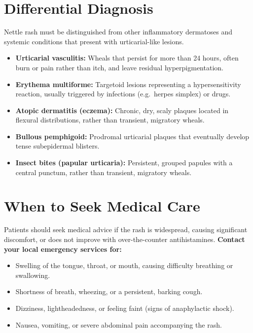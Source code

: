 \section*{Differential Diagnosis}
Nettle rash must be distinguished from other inflammatory dermatoses and systemic conditions that present with urticarial-like lesions.
\begin{itemize}
    \item \textbf{Urticarial vasculitis:} Wheals that persist for more than 24 hours, often burn or pain rather than itch, and leave residual hyperpigmentation.
    \item \textbf{Erythema multiforme:} Targetoid lesions representing a hypersensitivity reaction, usually triggered by infections (e.g.\ herpes simplex) or drugs.
    \item \textbf{Atopic dermatitis (eczema):} Chronic, dry, scaly plaques located in flexural distributions, rather than transient, migratory wheals.
    \item \textbf{Bullous pemphigoid:} Prodromal urticarial plaques that eventually develop tense subepidermal blisters.
    \item \textbf{Insect bites (papular urticaria):} Persistent, grouped papules with a central punctum, rather than transient, migratory wheals.
\end{itemize}

\section*{When to Seek Medical Care}
Patients should seek medical advice if the rash is widespread, causing significant discomfort, or does not improve with over-the-counter antihistamines.
\hfill \break
\textbf{Contact your local emergency services for:}
\begin{itemize}
    \item Swelling of the tongue, throat, or mouth, causing difficulty breathing or swallowing.
    \item Shortness of breath, wheezing, or a persistent, barking cough.
    \item Dizziness, lightheadedness, or feeling faint (signs of anaphylactic shock).
    \item Nausea, vomiting, or severe abdominal pain accompanying the rash.
\end{itemize}

